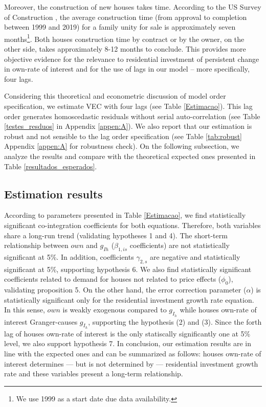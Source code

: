 \documentclass[12pt, a4paper]{article}
\begin{document}
Moreover, the construction of new houses takes time. According to the US Survey of Construction \cite{SoC_2020}, the average construction time (from approval to completion between 1999 and 2019) for a family unity for sale is approximately seven months\footnote{We use 1999 as a start date due data availability.}.
Both houses construction time by contract or by the owner, on the other side, takes approximately 8-12 months to conclude.
This provides more objective evidence for the relevance to residential investment of persistent change in own-rate of interest and for the use of lags in our model – more specifically, four lags.

Considering this theoretical and econometric discussion of model order specification, we estimate VEC with four lags  (see Table \ref{Estimacao}).
This lag order generates homoscedastic residuals without serial auto-correlation (see Table \ref{testes_resduos} in Appendix \ref{appen:A}).
We also report that our estimation is robust and not sensible to the lag order specification (see Table \ref{tab:robust} Appendix \ref{appen:A} for robustness check).
On the following subsection, we analyze the results and compare with the theoretical expected ones presented in Table \ref{resultados_esperados}.


\subsection{Estimation results}
\label{sec:orgb9e8535}
\label{sec:results}

According to parameters presented in Table \ref{Estimacao}, we find statistically significant co-integration  coefficients for both equations. 
Therefore, both variables share a long-run trend (validating hypotheses 1 and 4).
The short-term relationship between \(own\) and \(g_{Ih}\) (\(\beta_{1, is}\) coefficients) are not statistically significant at 5\%.
In addition, coefficients \(\gamma_{2,s}\) are negative and statistically significant at 5\%, supporting hypothesis 6.
We also find statistically significant coefficients related to demand for houses not related to price effects (\(\phi_0\)), validating proposition 5.
On the other hand, the error correction parameter (\(\alpha\)) is statistically significant only for the residential investment growth rate equation.
In this sense, \(own\) is weakly exogenous compared to \(g_{I_h}\) while houses own-rate of interest Granger-causes \(g_{I_h}\), supporting the hypothesis (2) and (3).
Since the forth lag of houses own-rate of interest is the only statiscally significantly one at 5\% level, we also support hypothesis 7.
In conclusion, our estimation results are in line with the expected ones and can be summarized as follows: houses own-rate of interest determines --- but is not determined by --- residential investment growth rate and these variables present a long-term relationship.
\end{document}
